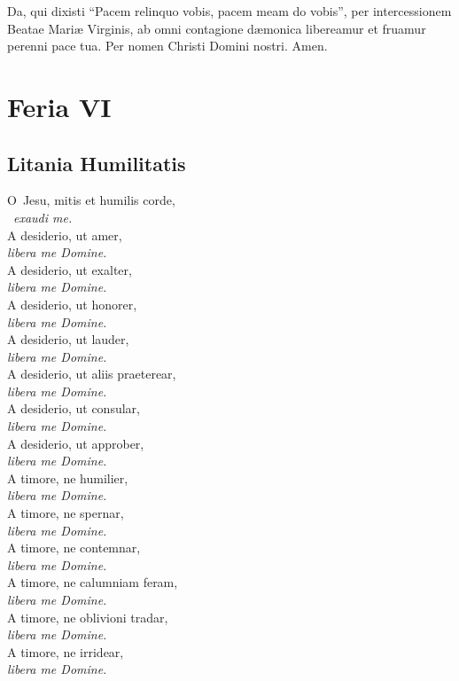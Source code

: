 \documentclass[9pt, twoside]{book}
\begin{document}
\noindent Da, qui dixisti “Pacem relinquo vobis, pacem meam do vobis”, per
intercessionem Beatae Mariæ Virginis, ab omni contagione dæmonica
libereamur et fruamur perenni pace tua. Per nomen Christi Domini nostri.
Amen. 

\section{Feria VI}

\subsection{Litania Humilitatis}

{\RaggedRight
\lettrine{O}\ Jesu, mitis et humilis corde,\\\tab\  \textit{exaudi me.}\\
A desiderio, ut amer,\\\tab \textit{libera me Domine.}\\
A desiderio, ut exalter,\\\tab \textit{libera me Domine.}\\
\pagebreak
A desiderio, ut honorer,\\\tab \textit{libera me Domine.}\\
A desiderio, ut lauder,\\\tab \textit{libera me Domine.}\\
A desiderio, ut aliis praeterear,\\\tab \textit{libera me Domine.}\\
A desiderio, ut consular,\\\tab \textit{libera me Domine.}\\
A desiderio, ut approber,\\\tab \textit{libera me Domine.}\\
A timore, ne humilier,\\\tab \textit{libera me Domine.}\\
A timore, ne spernar,\\\tab \textit{libera me Domine.}\\
A timore, ne contemnar,\\\tab \textit{libera me Domine.}\\
A timore, ne calumniam feram,\\\tab \textit{libera me Domine.}\\
A timore, ne oblivioni tradar,\\\tab \textit{libera me Domine.}\\
A timore, ne irridear,\\\tab \textit{libera me Domine.}\\
}
\end{document}
